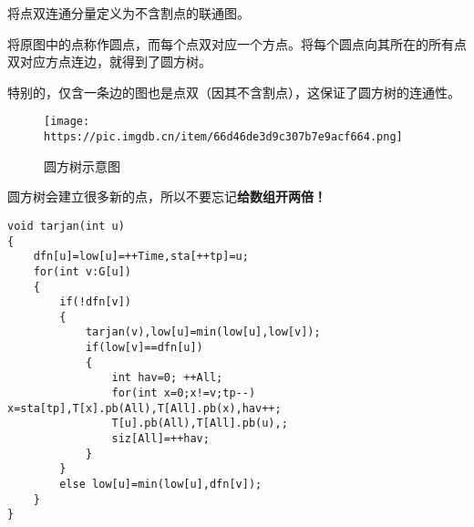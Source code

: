 将点双连通分量定义为不含割点的联通图。

将原图中的点称作圆点，而每个点双对应一个方点。将每个圆点向其所在的所有点双对应方点连边，就得到了圆方树。

特别的，仅含一条边的图也是点双（因其不含割点），这保证了圆方树的连通性。

\begin{figure}[htbp]
    \centering
    \texttt{[image: https://pic.imgdb.cn/item/66d46de3d9c307b7e9acf664.png]}
    \caption{圆方树示意图}
\end{figure}

圆方树会建立很多新的点，所以不要忘记\textbf{给数组开两倍！}

\begin{verbatim}
void tarjan(int u)
{
    dfn[u]=low[u]=++Time,sta[++tp]=u;
    for(int v:G[u])
    {
        if(!dfn[v])
        {
            tarjan(v),low[u]=min(low[u],low[v]);
            if(low[v]==dfn[u])
            {
                int hav=0; ++All;
                for(int x=0;x!=v;tp--) x=sta[tp],T[x].pb(All),T[All].pb(x),hav++;
                T[u].pb(All),T[All].pb(u),;
                siz[All]=++hav;
            }
        }
        else low[u]=min(low[u],dfn[v]);
    }
}
\end{verbatim}